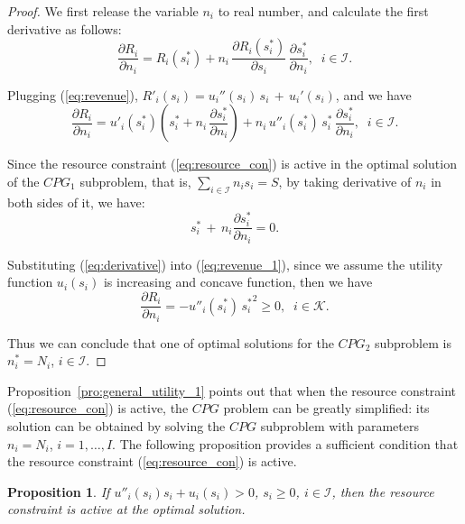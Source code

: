 \documentclass[twocolumn,10pt,twosided]{IEEEtran}
\newtheorem{proposition}{Proposition}
\begin{document}
\begin{proof}
We first release the
variable $n_i$ to real number, and calculate the first
derivative as follows:
\begin{equation}
\frac{\partial R_i}{\partial n_i}=R_i(s^*_i)+n_i\,\frac{\partial
R_i(s^*_i)}{\partial s_i}\,\frac{\partial s^*_i}{\partial n_i},
\;\;i\in\mathcal{I}.
\end{equation}

Plugging (\ref{eq:revenue}),
$R'_i(s_i)=u_i''(s_i)\,s_i\,+\,u_i'(s_i)$, and we have
\begin{equation}
\label{eq:revenue_1} \frac{\partial R_i}{\partial
n_i}=u'_i(s_i^*)\left( s_i^*+n_i\,\frac{\partial s^*_i}{\partial
n_i}\right)+n_i\,u''_i(s_i^*)\,s_i^*\,\frac{\partial s^*_i}{\partial
n_i}, \; \;i\in\mathcal{I}.
\end{equation}

Since the resource constraint (\ref{eq:resource_con}) is active in
the optimal solution of the $CPG_1$ subproblem, that is,
$\sum\limits_{i\in\mathcal{I}} n_i s_{i} = S$, by taking derivative
of $n_i$ in both sides of it, we have:
\begin{equation}
\label{eq:derivative}
    s^*_i\,+\, n_i\frac{\partial s^*_i}{\partial n_i}= 0.
\end{equation}

Substituting (\ref{eq:derivative}) into (\ref{eq:revenue_1}), since we assume the
utility function $u_i(s_i)$ is increasing and concave function, then
we have
\begin{equation}
\frac{\partial R_i}{\partial n_i}=-u''_i(s_i^*)\,{s_i^*}^2\ge 0, \;
\;i\in\mathcal{K}.
\end{equation}

Thus we can conclude that one of optimal solutions for the $CPG_2$
subproblem is $n_i^*=N_i$, $i\in \mathcal{I}$.
\end{proof}



Proposition~\ref{pro:general_utility_1} points out that when the resource constraint (\ref{eq:resource_con}) is active, the $CPG$ problem can be greatly simplified: its solution can be obtained by solving the $CPG$ subproblem with
parameters $n_i=N_i$, $i=1,\dots, I$. The following proposition
provides a sufficient condition that the resource constraint (\ref{eq:resource_con}) is active.

\begin{proposition}
If $u''_i(s_i)s_i+u_i(s_i)>0$, $s_i\ge 0$, $i\in \mathcal{I}$, then
the resource constraint is active at the optimal solution.
\end{proposition}
\end{document}
